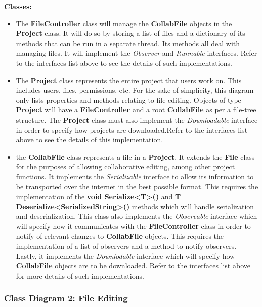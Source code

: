 \documentclass[twoside,letterpaper]{article}
\begin{document}
{\textbf{Classes:}
\begin{itemize}
	\item The \textbf{FileController} class will manage the \textbf{CollabFile} objects in the \textbf{Project} class. It will do so by storing a list of files and a dictionary of its methods that can be run in a separate thread. Its methods all deal with managing files. It will implement the \textit{Observer} and \textit{Runnable} interfaces. Refer to the interfaces list above to see the details of such implementations.
	\item The \textbf{Project} class represents the entire project that users work on. This includes users, files, permissions, etc. For the sake of simplicity, this diagram only lists properties and methods relating to file editing. Objects of type \textbf{Project} will have a \textbf{FileController} and a root \textbf{CollabFile} as per a file-tree structure. The \textbf{Project} class must also implement the \textit{Downloadable} interface in order to specify how projects are downloaded.Refer to the interfaces list above to see the details of this implementation.
	\item the \textbf{CollabFile} class represents a file in a \textbf{Project}. It extends the \textbf{File} class for the purposes of allowing collaborative editing, among other project functions. It implements the \textit{Serializable} interface to allow its information to be transported over the internet in the best possible format. This requires the implementation of the \textbf{void Serialize<T>()} and \textbf{T Deserialize<SerializedString>()} methods which will handle serialization and deserialization. This class also implements the \textit{Observable} interface which will specify how it communicates with the \textbf{FileController} class in order to notify of relevant changes to \textbf{CollabFile} objects. This requires the implementation of a list of observers and a method to notify observers. Lastly, it implements the \textit{Downlodable} interface which will specify how \textbf{CollabFile} objects are to be downloaded. Refer to the interfaces list above for more details of such implementations.
\end{itemize}

\subsubsection[Class Diagram 2: File Editing]{\rmfamily\bfseries\color{black}
	Class Diagram 2: File Editing}
\hypertarget{RefHeading22059017292}{}
\bigskip

}
\end{document}
